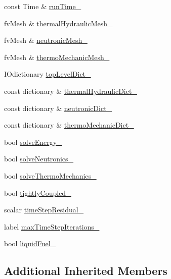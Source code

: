 \begin{DoxyCompactItemize}
\item 
const Time \& \hyperlink{classFoam_1_1multiphysicsControl_a8e84834799e62c4db747387a5ac21c78}{run\+Time\+\_\+}
\item 
fv\+Mesh \& \hyperlink{classFoam_1_1multiphysicsControl_aaa2e81e0391d923443a69d2fdfd3f019}{thermal\+Hydraulic\+Mesh\+\_\+}
\item 
fv\+Mesh \& \hyperlink{classFoam_1_1multiphysicsControl_a4c724e2b67effdcbe7fb2f07bb54b451}{neutronic\+Mesh\+\_\+}
\item 
fv\+Mesh \& \hyperlink{classFoam_1_1multiphysicsControl_a15b45777d69480c07a6f55a4592bcfed}{thermo\+Mechanic\+Mesh\+\_\+}
\item 
I\+Odictionary \hyperlink{classFoam_1_1multiphysicsControl_a7eff7514276e3ed2457c12cb4f9fa2b5}{top\+Level\+Dict\+\_\+}
\item 
const dictionary \& \hyperlink{classFoam_1_1multiphysicsControl_aaec86d5ff5c09bd92fed152511fd2157}{thermal\+Hydraulic\+Dict\+\_\+}
\item 
const dictionary \& \hyperlink{classFoam_1_1multiphysicsControl_af7e38e6089ee0698477645174dca70df}{neutronic\+Dict\+\_\+}
\item 
const dictionary \& \hyperlink{classFoam_1_1multiphysicsControl_ada048303635c403ad16bb119cbca5e6e}{thermo\+Mechanic\+Dict\+\_\+}
\item 
bool \hyperlink{classFoam_1_1multiphysicsControl_a61e49ad2dc69912019f1a585353efc36}{solve\+Energy\+\_\+}
\item 
bool \hyperlink{classFoam_1_1multiphysicsControl_ac71a84f5e214a5ef8eecc8eeb78cb181}{solve\+Neutronics\+\_\+}
\item 
bool \hyperlink{classFoam_1_1multiphysicsControl_ab791b50e0e6d7f36b5dda939f1426914}{solve\+Thermo\+Mechanics\+\_\+}
\item 
bool \hyperlink{classFoam_1_1multiphysicsControl_ace96c2451c51ae6a58533506af2b2ac6}{tightly\+Coupled\+\_\+}
\item 
scalar \hyperlink{classFoam_1_1multiphysicsControl_aeeb527045747f19d73cf0987e3df28ba}{time\+Step\+Residual\+\_\+}
\item 
label \hyperlink{classFoam_1_1multiphysicsControl_ad189249675714cfcdcf8ca42d7751ee5}{max\+Time\+Step\+Iterations\+\_\+}
\item 
bool \hyperlink{classFoam_1_1multiphysicsControl_af11691a185a4d561900c44d810050ddb}{liquid\+Fuel\+\_\+}
\end{DoxyCompactItemize}
\subsection*{Additional Inherited Members}


